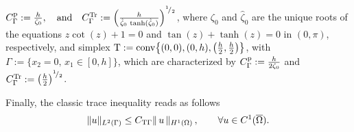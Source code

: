$C^{\mathrm{p}}_{\Gamma} := \tfrac{h}{\zeta_0}, \quad \mathrm{and} \quad 
C^{\mathrm{Tr}}_{\Gamma} := \left(\tfrac{h}{\hat{\zeta}_0 \, \tanh({\hat{\zeta}}_0)}\right)^{{}^{1}\!/_{2}}$,
%
where $\zeta_0$ and $\hat{\zeta}_0$ are the unique roots of the equations 
$z \cot(z) + 1 = 0$ and $\tan(z) + \tanh(z)  = 0$ in $(0, \pi)$, respectively, and 
%
simplex $\mathrm{T}:= {\rm conv} \big\{ (0, 0), (0, h), \big(\frac{h}{2}, \frac{h}{2}\big) \big\}$, 
with \linebreak
$\Gamma := \big \{ x_2 = 0, \, x_1 \in [0, h] \big \}$, which are characterized 
by
%
$C^{\mathrm{p}}_{\Gamma} := \tfrac{h}{2 \zeta_0}$ and \linebreak $
C^{\mathrm{Tr}}_{\Gamma} := \big(\tfrac{h}{2}\big)^{{}^{1}\!/_{2}}$.
%

Finally, the classic trace inequality reads as follows
%
\begin{equation}
	\| u \|_{\L{2}(\Gamma)} \leq \Ctr{\Gamma} \| \, u \,\|_{\H{1}(\Omega)} \,,
	\qquad \forall u \in \C{1}(\overline{\Omega}).
	\label{eq:trace-inequality}
\end{equation}

\label{ssec:sobolev-spaces-Qt}

